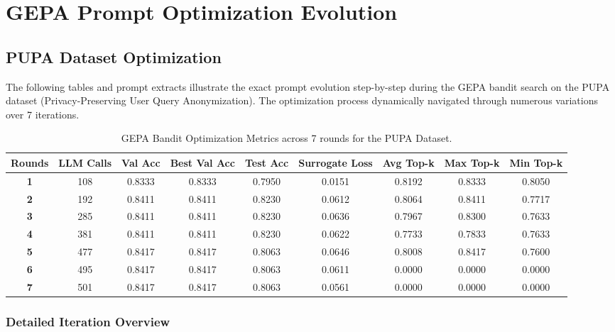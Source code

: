 \documentclass{report}
\begin{document}
\chapter{GEPA Prompt Optimization Evolution}

\section{PUPA Dataset Optimization}

The following tables and prompt extracts illustrate the exact prompt evolution step-by-step during the GEPA bandit search on the PUPA dataset (Privacy-Preserving User Query Anonymization). The optimization process dynamically navigated through numerous variations over 7 iterations.

\begin{table}[htbp]
    \centering
    \begin{tabular}{ccccccccc}
    \toprule
    \textbf{Rounds} & \textbf{LLM Calls} & \textbf{Val Acc} & \textbf{Best Val Acc} & \textbf{Test Acc} & \textbf{Surrogate Loss} & \textbf{Avg Top-k} & \textbf{Max Top-k} & \textbf{Min Top-k} \\
    \midrule
    \textbf{1} & 108 & 0.8333 & 0.8333 & 0.7950 & 0.0151 & 0.8192 & 0.8333 & 0.8050 \\
    \textbf{2} & 192 & 0.8411 & 0.8411 & 0.8230 & 0.0612 & 0.8064 & 0.8411 & 0.7717 \\
    \textbf{3} & 285 & 0.8411 & 0.8411 & 0.8230 & 0.0636 & 0.7967 & 0.8300 & 0.7633 \\
    \textbf{4} & 381 & 0.8411 & 0.8411 & 0.8230 & 0.0622 & 0.7733 & 0.7833 & 0.7633 \\
    \textbf{5} & 477 & 0.8417 & 0.8417 & 0.8063 & 0.0646 & 0.8008 & 0.8417 & 0.7600 \\
    \textbf{6} & 495 & 0.8417 & 0.8417 & 0.8063 & 0.0611 & 0.0000 & 0.0000 & 0.0000 \\
    \textbf{7} & 501 & 0.8417 & 0.8417 & 0.8063 & 0.0561 & 0.0000 & 0.0000 & 0.0000 \\
    \bottomrule
    \end{tabular}
    \caption{GEPA Bandit Optimization Metrics across 7 rounds for the PUPA Dataset.}
    \label{tab:pupa_metrics}
\end{table}

\subsection*{Detailed Iteration Overview}
\end{document}
